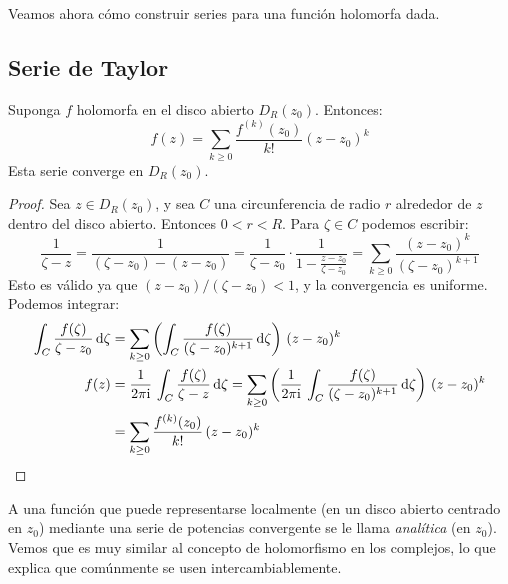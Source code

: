   Veamos ahora cómo construir series
  para una función holomorfa dada.

\subsection{Serie de Taylor}
\label{sec:Taylor-series}

  \begin{theorem}
    \label{theo:Taylor}
    Suponga \(f\) holomorfa en el disco abierto \(D_R(z_0)\).
    Entonces:
    \begin{equation}
      \label{eq:Taylor-series}
      f(z)
	= \sum_{k \ge 0}
	    \frac{f^{(k)}(z_0)}{k!} (z - z_0)^k
    \end{equation}
    Esta serie converge en \(D_R(z_0)\).
  \end{theorem}
  \begin{proof}
    Sea \(z \in D_R(z_0)\),
    y sea \(C\)
    una circunferencia de radio \(r\) alrededor de \(z\)
    dentro del disco abierto.
    Entonces \(0 < r < R\).
    Para \(\zeta \in C\) podemos escribir:
    \begin{equation*}
      \frac{1}{\zeta - z}
	= \frac{1}{(\zeta - z_0) - (z - z_0)}
	= \frac{1}
	       {\zeta - z_0}
		 \cdot \frac{1}{1 - \frac{z - z_0}{\zeta - z_0}}
	= \sum_{k \ge 0} \frac{(z - z_0)^k}{(\zeta - z_0)^{k + 1}}
    \end{equation*}
    Esto es válido ya que \((z - z_0) / (\zeta - z_0) < 1\),
    y la convergencia es uniforme.
    Podemos integrar:
    \begin{align*}
      \int_C \frac{f(\zeta)}{\zeta - z_0} \, \mathrm{d} \zeta
	&= \sum_{k \ge 0}
	     \left(
	       \int_C \frac{f(\zeta)}{(\zeta - z_0)^{k + 1}}
		 \, \mathrm{d} \zeta
	     \right) \, (z - z_0)^k \\
      f(z)
	&= \frac{1}{2 \pi \mathrm{i}} \,
	     \int_C \frac{f(\zeta)}{\zeta - z} \, \mathrm{d} \zeta
	 = \sum_{k \ge 0}
	     \left(
	       \frac{1}{2 \pi \mathrm{i}} \,
		 \int_C \frac{f(\zeta)}{(\zeta - z_0)^{k + 1}}
		   \, \mathrm{d} \zeta
	     \right) \, (z - z_0)^k \\
	&= \sum_{k \ge 0} \frac{f^{(k)}(z_0)}{k!} \, (z - z_0)^k
      \qedhere
    \end{align*}
  \end{proof}
  A una función que puede representarse localmente
  (en un disco abierto centrado en \(z_0\))
  mediante una serie de potencias convergente
  se le llama \emph{analítica}
  (en \(z_0\)).
  Vemos que es muy similar al concepto de holomorfismo
  en los complejos,
  lo que explica que comúnmente se usen intercambiablemente.

